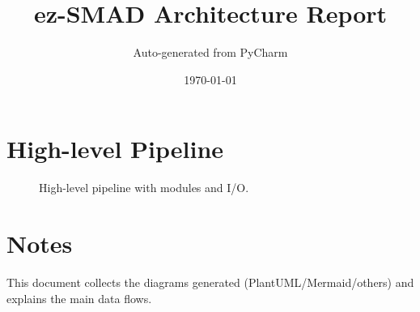 \documentclass[a4paper,11pt]{article}
\title{ez-SMAD Architecture Report}
\author{Auto-generated from PyCharm}
\date{\today}
\begin{document}
\maketitle

\section{High-level Pipeline}
\begin{figure}[h!]
  \centering
  
  \caption{High-level pipeline with modules and I/O.}
  \label{fig:pipeline_overview}
\end{figure}

\section{Notes}
This document collects the diagrams generated (PlantUML/Mermaid/others) and explains the main data flows.
\end{document}
